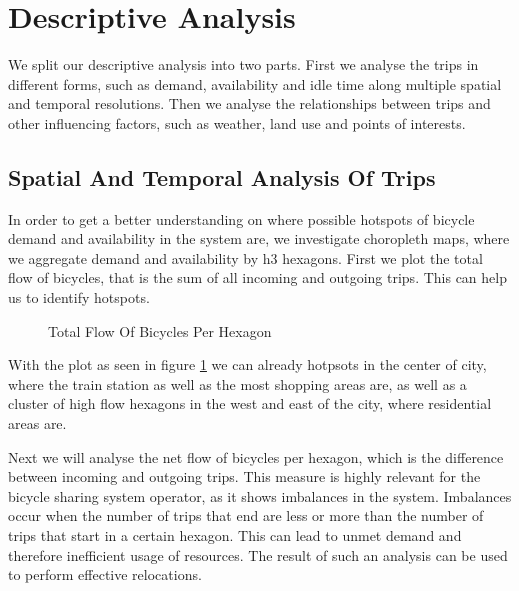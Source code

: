 \section{Descriptive Analysis}
\label{sec:descriptive_analysis}

We split our descriptive analysis into two parts.
First we analyse the trips in different forms, such as demand, availability and
idle time along multiple spatial and temporal resolutions. Then we analyse the
relationships between trips and other influencing factors, such as weather,
land use and points of interests.


\subsection{Spatial And Temporal Analysis Of Trips}
\label{subsec:descriptive_analysis_spatial_temporal}

In order to get a better understanding on where possible hotspots of bicycle
demand and availability in the system are, we investigate choropleth maps,
where we aggregate demand and availability by h3 hexagons.
First we plot the total flow of bicycles, that is the sum of all incoming and
outgoing trips. This can help us to identify hotspots.

\begin{figure}[htb]
    \centering
    \caption{Total Flow Of Bicycles Per Hexagon}
    \label{fig:descriptive_analysis_total_flow}
\end{figure}

With the plot as seen in figure \ref{fig:descriptive_analysis_total_flow} we
can already hotpsots in the center of city, where the train station as well as
the most shopping areas are, as well as a cluster of high flow hexagons in the
west and east of the city, where residential areas are.

Next we will analyse the net flow of bicycles per hexagon, which is the
difference between incoming and outgoing trips. This measure is highly relevant
for the bicycle sharing system operator, as it shows imbalances in the system.
Imbalances occur when the number of trips that end are less or more than the
number of trips that start in a certain hexagon. This can lead to unmet demand
and therefore inefficient usage of resources. The result of such an analysis
can be used to perform effective relocations.

